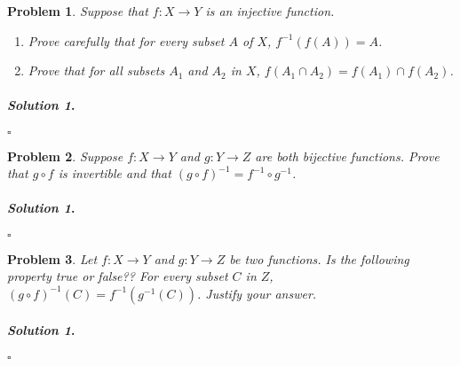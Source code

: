\documentclass{amsart}
\theoremstyle{plain}
\newtheorem{problem}{Problem}
\newenvironment{solution}{\paragraph{\emph{Solution 1}.}}{\hfill$\square$}
\begin{document}
\begin{problem}
Suppose that $f:X\rightarrow Y$ is an injective function.
\begin{enumerate}
\item Prove carefully that for every subset $A$ of $X$, $f^{-1}(f(A)) = A$.
\item Prove that for all subsets $A_{1}$ and $A_{2}$ in $X$, $f(A_{1} \cap A_{2}) = f(A_{1}) \cap f(A_{2})$.
\end{enumerate}
\end{problem}
\begin{solution}
\end{solution}

\begin{problem}
Suppose $f:X \rightarrow Y$ and $g:Y \rightarrow Z$ are both bijective functions.  Prove that $g \circ f$ is invertible and that $(g \circ f)^{-1} = f^{-1} \circ g^{-1}$.
\end{problem}
\begin{solution}
\end{solution}

\begin{problem}
Let $f:X\rightarrow Y$ and $g:Y \rightarrow Z$ be two functions.  Is the following property true or false??  For every subset $C$ in $Z$, $(g \circ f)^{-1}(C) = f^{-1}(g^{-1}(C))$.  Justify your answer.

\end{problem}
\begin{solution}
\end{solution}
\end{document}
